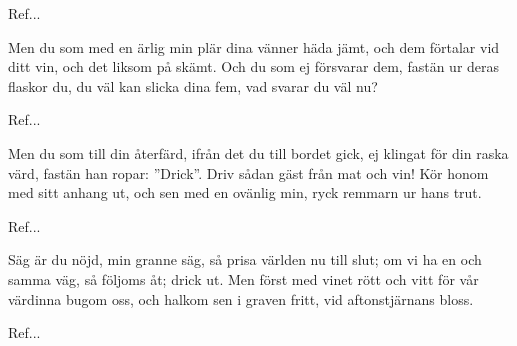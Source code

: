 \begin{SongText}
\begin{SongVerse}
Ref...
\end{SongVerse}
\begin{SongVerse}
Men du som med en ärlig min
plär dina vänner häda jämt,
och dem förtalar vid ditt vin,
och det liksom på skämt.
Och du som ej försvarar dem,
fastän ur deras flaskor du,
du väl kan slicka dina fem,
vad svarar du väl nu?
\end{SongVerse}
\begin{SongVerse}
Ref...
\end{SongVerse}
\begin{SongVerse}
Men du som till din återfärd,
ifrån det du till bordet gick,
ej klingat för din raska värd,
fastän han ropar: ”Drick”.
Driv sådan gäst från mat och vin!
Kör honom med sitt anhang ut,
och sen med en ovänlig min,
ryck remmarn ur hans trut.
\end{SongVerse}
\begin{SongVerse}
Ref...
\end{SongVerse}
\begin{SongVerse}
Säg är du nöjd, min granne säg,
så prisa världen nu till slut;
om vi ha en och samma väg,
så följoms åt; drick ut.
Men först med vinet rött och vitt
för vår värdinna bugom oss,
och halkom sen i graven fritt,
vid aftonstjärnans bloss.
\end{SongVerse}
\begin{SongVerse}
Ref... 
\end{SongVerse}
\end{SongText}
